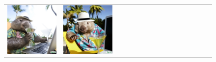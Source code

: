 \begin{figure}[ht!]
\begin{adjustwidth}{-0.8in}{-0.5in}
\begin{tabular}{cccccccccccccccccccc}
\multicolumn{3}{c}{\includegraphics[width=\twobytwocolwidth\textwidth]{figures/cherries/wombat3.jpg}} &
\multicolumn{3}{c}{\includegraphics[width=\twobytwocolwidth\textwidth]{figures/cherries/wombat4.jpg}} &&

\end{tabular}
\end{adjustwidth}
\end{figure}
